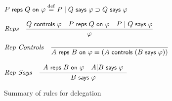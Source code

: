   


  

\begin{figure}
  \centering

  $\reps{P}{Q}{\varphi} \defn P \quoting Q \says \varphi \implies Q
  \says \varphi$


  $\irule{Q \controls \varphi \quad \reps{P}{Q}{\varphi} \quad P
    \quoting Q \says \varphi}{\varphi}{Reps}$


  $\irule{}{\reps{A}{B}{\varphi} \equiv (A \controls (B \says
    \varphi))}{Rep Controls}$


  $\irule{\begin{array}[b]{c} \reps{A}{B}{\varphi} \quad A | B \says
      \varphi
    \end{array}} {B \says \varphi} {Rep Says}$



  \caption{Summary of rules for delegation}
  \label{fig:summary-delegation-rules}
\end{figure}

